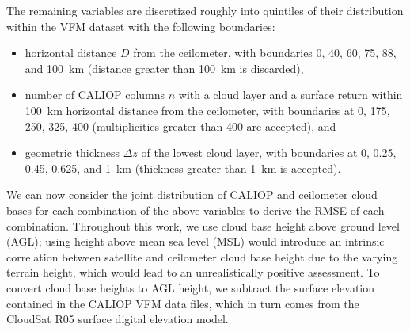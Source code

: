 \documentclass[essd,manuscript]{copernicus}
\begin{document}
The remaining variables are discretized roughly into quintiles of their
distribution within the VFM dataset with the
following boundaries:
\begin{itemize}
\item horizontal distance $D$ from the ceilometer, with boundaries 0, 40, 60,
  75, 88, and 100~km (distance greater than 100~km is discarded),
\item number of CALIOP columns $n$ with a cloud layer and a surface return
  within 100~km horizontal distance from the ceilometer, with boundaries at 0,
  175, 250, 325, 400 (multiplicities greater than 400 are accepted), and
\item geometric thickness $\Delta z$ of the lowest cloud layer, with boundaries
  at 0, 0.25, 0.45, 0.625, and 1~km (thickness greater than 1~km is accepted).
\end{itemize}

We can now consider the joint distribution of CALIOP and ceilometer cloud bases
for each combination of the above variables to derive the RMSE of each
combination.  Throughout this work, we use cloud base height above ground level
(AGL); using height above mean sea level (MSL) would introduce an intrinsic
correlation between satellite and ceilometer cloud base height due to the
varying terrain height, which would lead to an unrealistically positive
assessment.  To convert cloud base heights to AGL height, we subtract the
surface elevation contained in the CALIOP VFM data files, which in turn comes
from the CloudSat R05 surface digital elevation model. 
\end{document}
